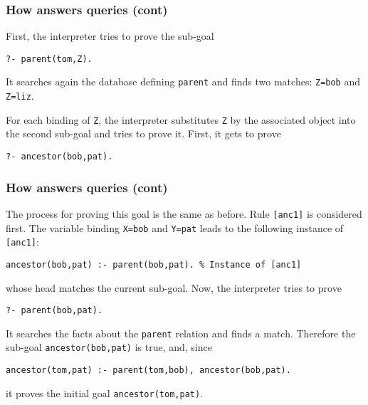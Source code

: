 %
\begin{frame}[containsverbatim]
\frametitle{How \Prolog answers queries (cont)}

First, the interpreter tries to prove the sub-goal
{\small
\begin{verbatim}
?- parent(tom,Z).
\end{verbatim}
}
It searches again the database defining \texttt{parent} and finds two
matches: \texttt{Z=bob} and \texttt{Z=liz}.

\bigskip

For each binding of \texttt{Z}, the interpreter substitutes \texttt{Z}
by the associated object into the second sub-goal and tries to prove
it. First, it gets to prove
{\small
\begin{verbatim}
?- ancestor(bob,pat).
\end{verbatim}
}

\end{frame}

%
\begin{frame}[containsverbatim]
\frametitle{How \Prolog answers queries (cont)}

The process for proving this goal is the same as before. Rule
\texttt{[anc1]} is considered first. The variable binding
\texttt{X=bob} and \texttt{Y=pat} leads to the following instance of
\texttt{[anc1]}:
{\small
\begin{verbatim}
ancestor(bob,pat) :- parent(bob,pat). % Instance of [anc1]
\end{verbatim}
}
whose head matches the current sub-goal. Now, the interpreter tries to
prove
{\small
\begin{verbatim}
?- parent(bob,pat).
\end{verbatim}
} 
It searches the facts about the \texttt{parent} relation and finds a
match. Therefore the sub-goal \texttt{ancestor(bob,pat)} is true, and,
since
{\small
\begin{verbatim}
ancestor(tom,pat) :- parent(tom,bob), ancestor(bob,pat).
\end{verbatim}
}
it proves the initial goal \texttt{ancestor(tom,pat)}.

\end{frame}

